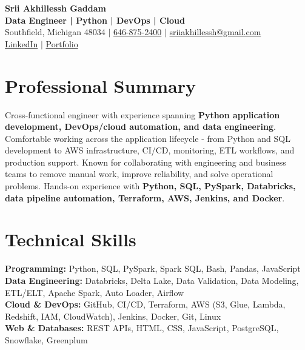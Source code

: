 \documentclass[letterpaper,10pt]{article}
\begin{document}
\fontsize{9.35pt}{10.45pt}\selectfont

\begin{center}
    {\LARGE \textbf{Srii Akhillessh Gaddam}} \\[-1pt]
    \textbf{Data Engineer | Python | DevOps | Cloud} \\[2pt]
    Southfield, Michigan 48034 $|$
    \href{tel:6468752400}{646-875-2400} $|$
    \href{mailto:sriiakhillessh@gmail.com}{sriiakhillessh@gmail.com} \\[1pt]
    \href{https://www.linkedin.com/in/srii-akhiilessh-gaddam-b48668191/}{LinkedIn} $|$
    \href{https://sriiakhillesshg.github.io/portfolio/}{Portfolio}
\end{center}
\vspace{-8pt}

\section{Professional Summary}
\small{Cross-functional engineer with experience spanning \textbf{Python application development, DevOps/cloud automation, and data engineering}. Comfortable working across the application lifecycle - from Python and SQL development to AWS infrastructure, CI/CD, monitoring, ETL workflows, and production support. Known for collaborating with engineering and business teams to remove manual work, improve reliability, and solve operational problems. Hands-on experience with \textbf{Python, SQL, PySpark, Databricks, data pipeline automation, Terraform, AWS, Jenkins, and Docker}.}

\section{Technical Skills}
\small{
\textbf{Programming:} Python, SQL, PySpark, Spark SQL, Bash, Pandas, JavaScript \\
\textbf{Data Engineering:} Databricks, Delta Lake, Data Validation, Data Modeling, ETL/ELT, Apache Spark, Auto Loader, Airflow \\
\textbf{Cloud \& DevOps:} GitHub, CI/CD, Terraform, AWS (S3, Glue, Lambda, Redshift, IAM, CloudWatch), Jenkins, Docker, Git, Linux \\
\textbf{Web \& Databases:} REST APIs, HTML, CSS, JavaScript, PostgreSQL, Snowflake, Greenplum
}

\end{document}
